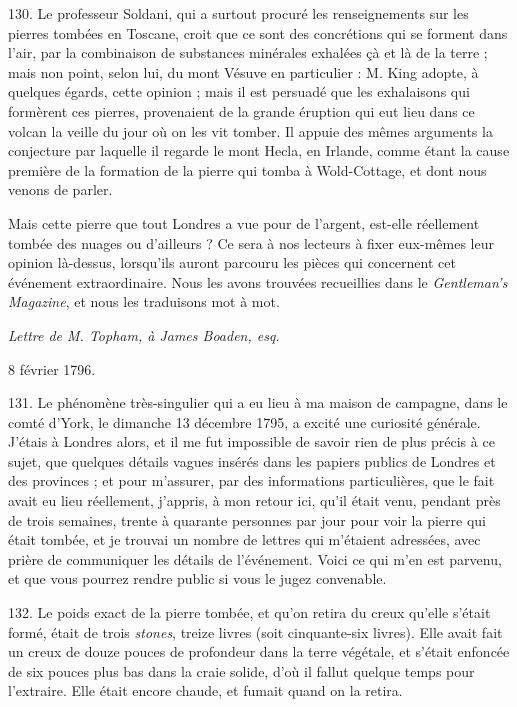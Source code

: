 \documentclass[a4paper, 11pt, oneside, polutonikogreek, french]{article}
\begin{document}
130. Le professeur Soldani, qui a surtout procuré les renseignements sur les pierres tombées en Toscane, croit que ce sont des concrétions qui se forment dans l'air, par la combinaison de substances minérales exhalées çà et là de la terre ; mais non point, selon lui, du mont Vésuve en particulier : M. King adopte, à quelques égards, cette opinion ; mais il est persuadé que les exhalaisons qui formèrent ces pierres, provenaient de la grande éruption qui eut lieu dans ce volcan la veille du jour où on les vit tomber. Il appuie des mêmes arguments la conjecture par laquelle il regarde le mont Hecla, en Irlande, comme étant la cause première de la formation de la pierre qui tomba à Wold-Cottage, et dont nous venons de parler.

Mais cette pierre que tout Londres a vue pour de l'argent, est-elle réellement tombée des nuages ou d'ailleurs ? Ce sera à nos lecteurs à fixer eux-mêmes leur opinion là-dessus, lorsqu'ils auront parcouru les pièces qui concernent cet événement extraordinaire. Nous les avons trouvées recueillies dans le \emph{Gentleman's Magazine}, et nous les traduisons mot à mot.

\begin{center}
\emph{Lettre de M. Topham, à James Boaden, esq.}

8 février 1796.
\end{center}

131. Le phénomène très-singulier qui a eu lieu à ma maison de campagne, dans le comté d'York, le dimanche 13 décembre 1795, a excité une curiosité générale. J'étais à Londres alors, et il me fut impossible de savoir rien de plus précis à ce sujet, que quelques détails vagues insérés dans les papiers publics de Londres et des provinces ; et pour m'assurer, par des informations particulières, que le fait avait eu lieu réellement, j'appris, à mon retour ici, qu'il était venu, pendant près de trois semaines, trente à quarante personnes par jour pour voir la pierre qui était tombée, et je trouvai un nombre de lettres qui m'étaient adressées, avec prière de communiquer les détails de l'événement. Voici ce qui m'en est parvenu, et que vous pourrez rendre public si vous le jugez convenable.

132. Le poids exact de la pierre tombée, et qu'on retira du creux qu'elle s'était formé, était de trois \emph{stones}, treize livres (soit cinquante-six livres). Elle avait fait un creux de douze pouces de profondeur dans la terre végétale, et s'était enfoncée de six pouces plus bas dans la craie solide, d'où il fallut quelque temps pour l'extraire. Elle était encore chaude, et fumait quand on la retira.
\end{document}
